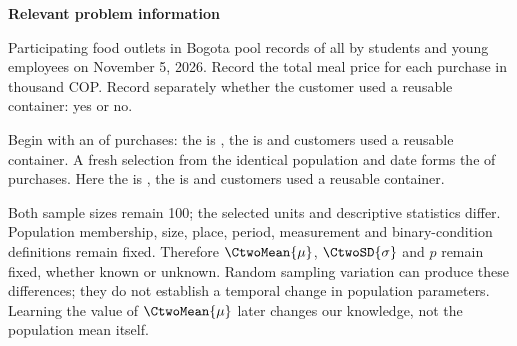 \clearpage



\textbf{Relevant problem information}

\begin{probleminfoexcerpt}
Participating food outlets in Bogota pool records of all     by students and young employees on November 5, 2026. Record the total meal price for each purchase in thousand COP. Record separately whether the customer used a reusable container: yes or no.
\end{probleminfoexcerpt}

\begin{probleminfoexcerpt}
Begin with an     of  purchases: the    is   , the    is    and  customers used a reusable container. A fresh selection from the identical population and date forms the     of  purchases. Here the    is   , the    is    and  customers used a reusable container.
\end{probleminfoexcerpt}



Both sample sizes remain 100; the selected units and descriptive statistics differ. Population membership, size, place, period, measurement and binary-condition definitions remain fixed. Therefore $\CtwoMean{\mu}$, $\CtwoSD{\sigma}$ and $p$ remain fixed, whether known or unknown. Random sampling variation can produce these differences; they do not establish a temporal change in population parameters. Learning the value of $\CtwoMean{\mu}$ later changes our knowledge, not the population mean itself.

